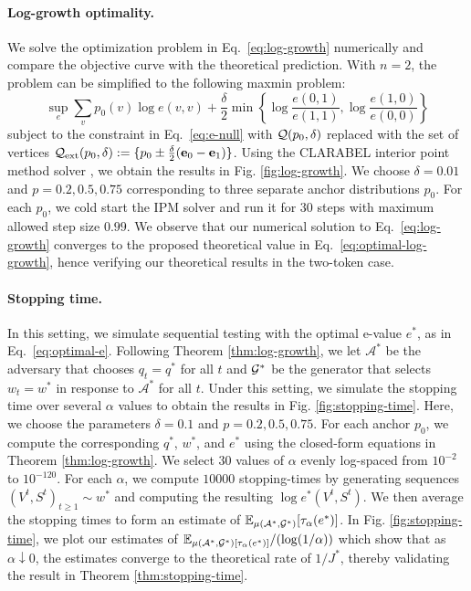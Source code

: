 \paragraph{Log-growth optimality.}
We solve the optimization problem in Eq.~\eqref{eq:log-growth} numerically and compare the objective curve with the theoretical prediction.
With $n=2$, the problem can be simplified to the following maxmin problem:
$$\sup_e\sum_{v} p_0(v)\log e(v,v) + \frac{\delta}{2}\min\left\{\log \frac{e(0,1)}{e(1,1)}, \log \frac{e(1,0)}{e(0,0)}\right\}$$
subject to the constraint in Eq.~\eqref{eq:e-null} with $\mathcal{Q}(p_0,\delta)$ replaced with the set of vertices $\mathcal{Q}_{\text{ext}}(p_0,\delta) := \{p_0 \pm \frac{\delta}{2}(\mathbf{e}_0-\mathbf{e}_1)\}$. Using the CLARABEL interior point method solver \cite{Clarabel_2024}, we obtain the results in Fig. \ref{fig:log-growth}. We choose $\delta = 0.01$ and $p = 0.2,0.5,0.75$ corresponding to three separate anchor distributions $p_0$. For each $p_0$, we cold start the IPM solver and run it for $30$ steps with maximum allowed step size $0.99$. We observe that our numerical solution to Eq.~\eqref{eq:log-growth} converges to the proposed theoretical value in Eq.~\eqref{eq:optimal-log-growth}, hence verifying our theoretical results in the two-token case. 

\paragraph{Stopping time.}
In this setting, we simulate sequential testing with the optimal e-value $e^*$, as in Eq.~\eqref{eq:optimal-e}. Following Theorem \ref{thm:log-growth}, we let $\mathcal{A}^*$ be the adversary that chooses $q_t = q^*$ for all $t$ and $\mathcal{G}^*$ be the generator that selects $w_t = w^*$ in response to $\mathcal{A}^*$ for all $t$. Under this setting, we simulate the stopping time over several $\alpha$ values to obtain the results in Fig. \ref{fig:stopping-time}. Here, we choose the parameters $\delta = 0.1$ and $p= 0.2,0.5,0.75$. For each anchor $p_0$, we compute the corresponding $q^*$, $w^*$, and $e^*$ using the closed-form equations in Theorem \ref{thm:log-growth}. We select $30$ values of $\alpha$ evenly log-spaced from $10^{-2}$ to $10^{-120}$. For each $\alpha$, we compute $10000$ stopping-times by generating sequences $(V^t,S^t)_{t \geq 1} \sim w^*$ and computing the resulting $\log e^*(V^t,S^t)$. We then average the stopping times to form an estimate of $\mathbb{E}_{\mu(\mathcal{A}^*,\mathcal{G}^*)}[\tau_{\alpha}(e^*)]$. In Fig. \ref{fig:stopping-time}, we plot our estimates of $\mathbb{E}_{\mu(\mathcal{A}^*,\mathcal{G}^*)[\tau_{\alpha}(e^*)]}/(\log(1/\alpha))$ which show that as $\alpha \downarrow 0$, the estimates converge to the theoretical rate of $1/J^*$, thereby validating the result in Theorem \ref{thm:stopping-time}.

